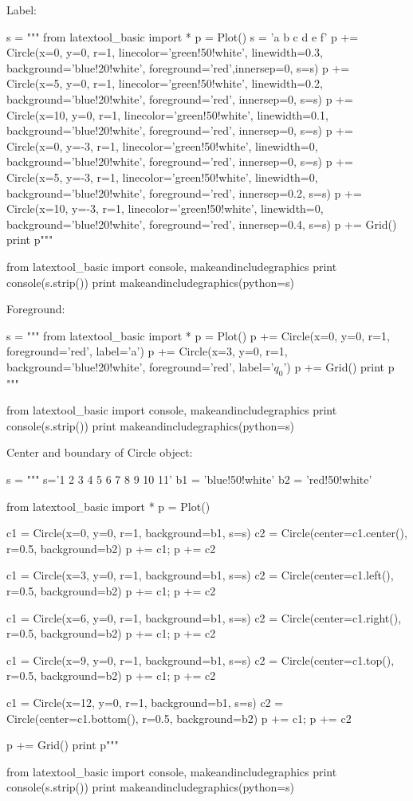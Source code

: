 Label:
\begin{python}
s = """
from latextool_basic import *
p = Plot()
s = 'a b c d e f'
p += Circle(x=0, y=0, r=1, linecolor='green!50!white', linewidth=0.3, 
            background='blue!20!white', foreground='red',innersep=0, s=s)
p += Circle(x=5, y=0, r=1, linecolor='green!50!white', linewidth=0.2, 
            background='blue!20!white', foreground='red', innersep=0, s=s)
p += Circle(x=10, y=0, r=1, linecolor='green!50!white', linewidth=0.1, 
            background='blue!20!white', foreground='red', innersep=0, s=s)
p += Circle(x=0, y=-3, r=1, linecolor='green!50!white', linewidth=0, 
            background='blue!20!white', foreground='red', innersep=0, s=s)
p += Circle(x=5, y=-3, r=1, linecolor='green!50!white', linewidth=0, 
            background='blue!20!white', foreground='red', 
            innersep=0.2, s=s)
p += Circle(x=10, y=-3, r=1, linecolor='green!50!white', linewidth=0, 
            background='blue!20!white', foreground='red',
            innersep=0.4, s=s)
p += Grid()
print p"""

from latextool_basic import console, makeandincludegraphics
print console(s.strip())
print makeandincludegraphics(python=s)
\end{python}




Foreground:
\begin{python}
s = """
from latextool_basic import *
p = Plot()
p += Circle(x=0, y=0, r=1, foreground='red', label='a')
p += Circle(x=3, y=0, r=1, background='blue!20!white', 
                           foreground='red', label='$q_0$')
p += Grid()
print p
"""

from latextool_basic import console, makeandincludegraphics
print console(s.strip())
print makeandincludegraphics(python=s)
\end{python}




Center and boundary of Circle object:
\begin{python}
s = """
s='1 2 3 4 5 6 7 8 9 10 11'
b1 = 'blue!50!white'
b2 = 'red!50!white'

from latextool_basic import *
p = Plot()

c1 = Circle(x=0, y=0, r=1, background=b1, s=s)
c2 = Circle(center=c1.center(), r=0.5, background=b2)
p += c1; p += c2

c1 = Circle(x=3, y=0, r=1, background=b1, s=s)
c2 = Circle(center=c1.left(), r=0.5, background=b2)
p += c1; p += c2

c1 = Circle(x=6, y=0, r=1, background=b1, s=s)
c2 = Circle(center=c1.right(), r=0.5, background=b2)
p += c1; p += c2

c1 = Circle(x=9, y=0, r=1, background=b1, s=s)
c2 = Circle(center=c1.top(), r=0.5, background=b2)
p += c1; p += c2

c1 = Circle(x=12, y=0, r=1, background=b1, s=s)
c2 = Circle(center=c1.bottom(), r=0.5, background=b2)
p += c1; p += c2

p += Grid()
print p"""

from latextool_basic import console, makeandincludegraphics
print console(s.strip())
print makeandincludegraphics(python=s)
\end{python}
